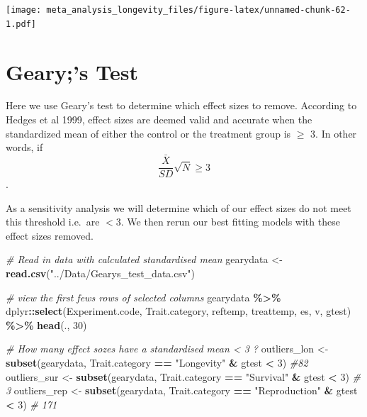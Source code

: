 \documentclass[
]{article}
\newenvironment{Shaded}{\begin{snugshade}}{\end{snugshade}}
\newcommand{\CommentTok}[1]{\textcolor[rgb]{0.56,0.35,0.01}{\textit{#1}}}
\newcommand{\DecValTok}[1]{\textcolor[rgb]{0.00,0.00,0.81}{#1}}
\newcommand{\FunctionTok}[1]{\textcolor[rgb]{0.13,0.29,0.53}{\textbf{#1}}}
\newcommand{\NormalTok}[1]{#1}
\newcommand{\OtherTok}[1]{\textcolor[rgb]{0.56,0.35,0.01}{#1}}
\newcommand{\SpecialCharTok}[1]{\textcolor[rgb]{0.81,0.36,0.00}{\textbf{#1}}}
\newcommand{\StringTok}[1]{\textcolor[rgb]{0.31,0.60,0.02}{#1}}
\begin{document}
\texttt{[image: meta\_analysis\_longevity\_files/figure-latex/unnamed-chunk-62-1.pdf]}

\hypertarget{gearys-test}{%
\section{Geary;'s Test}\label{gearys-test}}

Here we use Geary's test to determine which effect sizes to remove.
According to Hedges et al 1999, effect sizes are deemed valid and
accurate when the standardized mean of either the control or the
treatment group is \(\geq\) 3. In other words, if
\[ \frac{\bar{X}}{SD} \sqrt{N} \geq 3\].

As a sensitivity analysis we will determine which of our effect sizes do
not meet this threshold i.e.~are \(<3\). We then rerun our best fitting
models with these effect sizes removed.

\begin{Shaded}
\begin{Highlighting}[]
\CommentTok{\# Read in data with calculated standardised mean}
\NormalTok{gearydata }\OtherTok{\textless{}{-}} \FunctionTok{read.csv}\NormalTok{(}\StringTok{"../Data/Gearys\_test\_data.csv"}\NormalTok{)}

\CommentTok{\# view the first fews rows of selected columns}
\NormalTok{gearydata }\SpecialCharTok{\%\textgreater{}\%}
\NormalTok{    dplyr}\SpecialCharTok{::}\FunctionTok{select}\NormalTok{(Experiment.code, Trait.category, reftemp, treattemp,}
\NormalTok{        es, v, gtest) }\SpecialCharTok{\%\textgreater{}\%}
    \FunctionTok{head}\NormalTok{(., }\DecValTok{30}\NormalTok{)}

\CommentTok{\# How many effect sozes have a standardised mean \textless{} 3 ?}
\NormalTok{outliers\_lon }\OtherTok{\textless{}{-}} \FunctionTok{subset}\NormalTok{(gearydata, Trait.category }\SpecialCharTok{==} \StringTok{"Longevity"} \SpecialCharTok{\&}
\NormalTok{    gtest }\SpecialCharTok{\textless{}} \DecValTok{3}\NormalTok{)  }\CommentTok{\#82}
\NormalTok{outliers\_sur }\OtherTok{\textless{}{-}} \FunctionTok{subset}\NormalTok{(gearydata, Trait.category }\SpecialCharTok{==} \StringTok{"Survival"} \SpecialCharTok{\&}
\NormalTok{    gtest }\SpecialCharTok{\textless{}} \DecValTok{3}\NormalTok{)  }\CommentTok{\# 3 }
\NormalTok{outliers\_rep }\OtherTok{\textless{}{-}} \FunctionTok{subset}\NormalTok{(gearydata, Trait.category }\SpecialCharTok{==} \StringTok{"Reproduction"} \SpecialCharTok{\&}
\NormalTok{    gtest }\SpecialCharTok{\textless{}} \DecValTok{3}\NormalTok{)  }\CommentTok{\# 171}
\end{Highlighting}
\end{Shaded}
\end{document}

